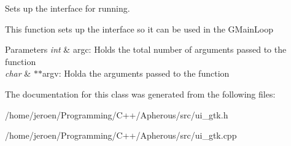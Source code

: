 Sets up the interface for running. 

This function sets up the interface so it can be used in the G\+Main\+Loop


\begin{DoxyParams}{Parameters}
{\em int} & argc\+: Holds the total number of arguments passed to the function \\
\hline
{\em char} & $\ast$$\ast$argv\+: Holda the arguments passed to the function \\
\hline
\end{DoxyParams}


The documentation for this class was generated from the following files\+:\begin{DoxyCompactItemize}
\item 
/home/jeroen/\+Programming/\+C++/\+Apherous/src/ui\+\_\+gtk.\+h\item 
/home/jeroen/\+Programming/\+C++/\+Apherous/src/ui\+\_\+gtk.\+cpp\end{DoxyCompactItemize}
